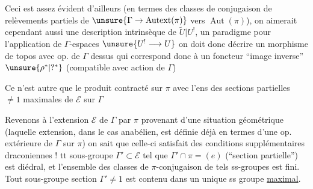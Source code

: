 Ceci est assez évident d'ailleurs
(en termes  des classes de
\inserted{\(\pi\)-}conjugaison de relèvements partiels de
\(\unsure{\Gamma\to\operatorname{Autext}(\pi)}\) vers
\(\operatorname{Aut}(\pi)\)), on aimerait cependant aussi une
description intrinsèque de \(\widetilde U|U^!\),
 un paradigme pour l'application de
\(\Gamma\)-espaces \(\unsure{U^!\longrightarrow U}\)
on doit donc décrire un morphisme de topos avec op. de \(\Gamma\) dessus
qui correspond donc à un  foncteur
``image inverse'' \(\unsure{\rho^*|?^*}\)
(compatible avec action de \(\Gamma\))

Ce  n'est autre que le produit contracté sur
\(\pi\) avec l'ens des sections partielles \(\ne1\) maximales de
\(\mathcal E\) sur \(\Gamma\)



Revenons à l'extension \(\mathcal E\) de \(\Gamma\) par \(\pi\)
provenant d'une situation géométrique
(laquelle extension, dans le cas anabélien, est définie déjà en termes
d'une op. extérieure de \(\Gamma\) sur \(\pi\))
on sait que celle-ci satisfait des conditions supplémentaires
draconiennes !
tt sous-groupe \(\Gamma'\subset\mathcal E\) tel que
\(\Gamma'\cap\pi=(e)\) (``section partielle'') est
 diédral,
et l'ensemble des classes de \(\pi\)-conjugaison de tels ss-groupes
est fini.
Tout sous-groupe section \(\Gamma'\ne1\) est contenu dans un unique
ss groupe  \uline{maximal}.


